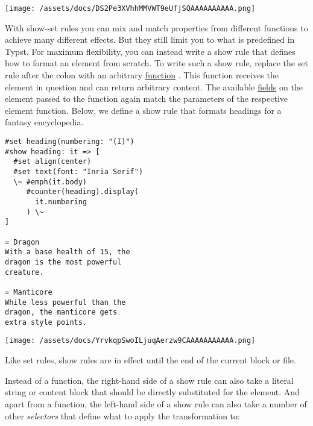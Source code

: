 \texttt{[image: /assets/docs/DS2Pe3XVhhMMVWT9eUfjSQAAAAAAAAAA.png]}

With show-set rules you can mix and match properties from different
functions to achieve many different effects. But they still limit you to
what is predefined in Typst. For maximum flexibility, you can instead
write a show rule that defines how to format an element from scratch. To
write such a show rule, replace the set rule after the colon with an
arbitrary \href{/docs/reference/foundations/function/}{function} . This
function receives the element in question and can return arbitrary
content. The available \href{/docs/reference/scripting/\#fields}{fields}
on the element passed to the function again match the parameters of the
respective element function. Below, we define a show rule that formats
headings for a fantasy encyclopedia.

\begin{verbatim}
#set heading(numbering: "(I)")
#show heading: it => [
  #set align(center)
  #set text(font: "Inria Serif")
  \~ #emph(it.body)
     #counter(heading).display(
       it.numbering
     ) \~
]

= Dragon
With a base health of 15, the
dragon is the most powerful
creature.

= Manticore
While less powerful than the
dragon, the manticore gets
extra style points.
\end{verbatim}

\texttt{[image: /assets/docs/YrvkqpSwoILjuqAerzw9CAAAAAAAAAAA.png]}

Like set rules, show rules are in effect until the end of the current
block or file.

Instead of a function, the right-hand side of a show rule can also take
a literal string or content block that should be directly substituted
for the element. And apart from a function, the left-hand side of a show
rule can also take a number of other \emph{selectors} that define what
to apply the transformation to:

